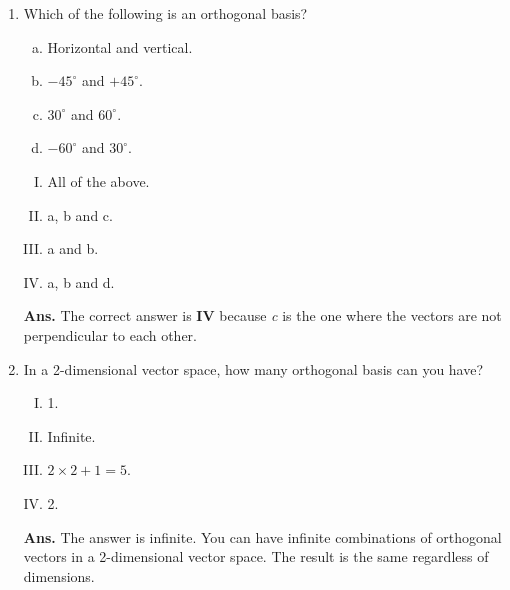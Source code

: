 \documentclass[12pt]{article}
\newcommand\tbf[1]{\textbf{#1}}
\begin{document}
\begin{enumerate}[1.]
\item Which of the following is an orthogonal basis? \newline
\begin{enumerate}[a)]
\item Horizontal and vertical.
\item $-45^\circ$ and $+45^\circ$.
\item $30^\circ$ and $60^\circ$.
\item $-60^\circ$ and $30^\circ$. \newline
\end{enumerate}
\begin{enumerate}[I.]
\item All of the above.
\item a, b and c.
\item a and b.
\item a, b and d. \newline
\end{enumerate}
\tbf{Ans. }The correct answer is \tbf{IV} because \textit{c} is the one where the vectors are not perpendicular to each other. \newline

\item In a 2-dimensional vector space, how many orthogonal basis can you have? \newline
\begin{enumerate}[I.]
\item 1.
\item Infinite.
\item $2\times 2 + 1 = 5$.
\item 2. \newline
\end{enumerate}
\tbf{Ans. }The answer is infinite. You can have infinite combinations of orthogonal vectors in a 2-dimensional vector space. The result is the same regardless of dimensions. \newline


\end{enumerate}
\end{document}
